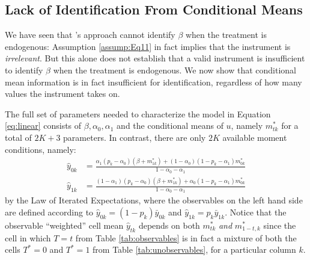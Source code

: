 
\subsection{Lack of Identification From Conditional Means}
We have seen that \cite{Mahajan}'s approach cannot identify $\beta$ when the treatment is endogenous: Assumption \ref{assump:Eq11} in fact implies that the instrument is \emph{irrelevant}. 
But this alone does not establish that a valid instrument is insufficient to identify $\beta$ when the treatment is endogenous.
We now show that conditional mean information is in fact insufficient for identification, regardless of how many values the instrument takes on.

The full set of parameters needed to characterize the model in Equation \ref{eq:linear} consists of $\beta, \alpha_0, \alpha_1$ and the conditional means of $u$, namely $m^*_{tk}$ for a total of $2K+3$ parameters.
In contrast, there are only $2K$ available moment conditions, namely:
\begin{align}
  \label{eq:MC0}
  \hat{y}_{0k} &=\frac{\alpha_1(p_k - \alpha_0)(\beta + m_{1k}^*) + (1 - \alpha_0)(1 - p _k -  \alpha_1)m_{0k}^*}{1 - \alpha_0 - \alpha_1} \\[1.5ex]
  \label{eq:MC1}
  \hat{y}_{1k} &= \frac{(1-\alpha_1)(p_k - \alpha_0)(\beta+m_{1k}^*)+  \alpha_0(1-p_k - \alpha_1)m_{0k}^*}{1-\alpha_0 - \alpha_1}
\end{align}
by the Law of Iterated Expectations, where the observables on the left hand side are defined according to $\hat{y}_{0k} = (1-p_k)\bar{y}_{0k}$ and $\hat{y}_{1k}= p_k \bar{y}_{1k}$.
Notice that the observable ``weighted'' cell mean $\hat{y}_{tk}$ depends on both $m^*_{tk}$ \emph{and} $m^*_{1-t,k}$ since the cell in which $T=t$ from Table \ref{tab:observables} is in fact a mixture of both the cells $T^*=0$ and $T^*=1$ from Table \ref{tab:unobservables}, for a particular column $k$.

